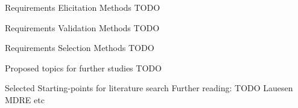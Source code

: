 \documentclass{beamer}
\begin{document}
\begin{frame}[fragile]{Requirements Elicitation Methods}
  TODO
\end{frame}

\begin{frame}[fragile]{Requirements Validation Methods}
  TODO
\end{frame}

\begin{frame}[fragile]{Requirements Selection Methods}
  TODO
\end{frame}

\begin{frame}[fragile]{Proposed topics for further studies}
  TODO
\end{frame}

\begin{frame}[fragile]{Selected Starting-points for literature search}
  Further reading: TODO Lauesen MDRE etc
\end{frame}


    
\end{document}
